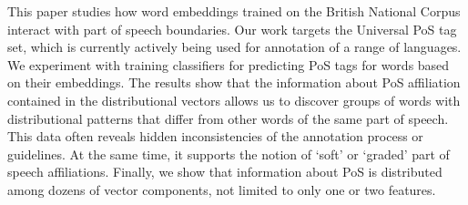 This paper studies how word embeddings trained on the British National Corpus interact with part of speech boundaries. Our work targets the Universal PoS tag set, which is currently actively being used for annotation of a range of languages. We experiment with training classifiers for predicting PoS tags for words based on their embeddings. The results show that the information about PoS affiliation contained in the distributional vectors allows us to discover groups of words with distributional patterns that differ from other words of the same part of speech. This data often reveals hidden inconsistencies of the annotation process or guidelines. At the same time, it supports the notion of `soft' or `graded' part of speech affiliations. Finally, we show that information about PoS is distributed among dozens of vector components, not limited to only one or two features.

